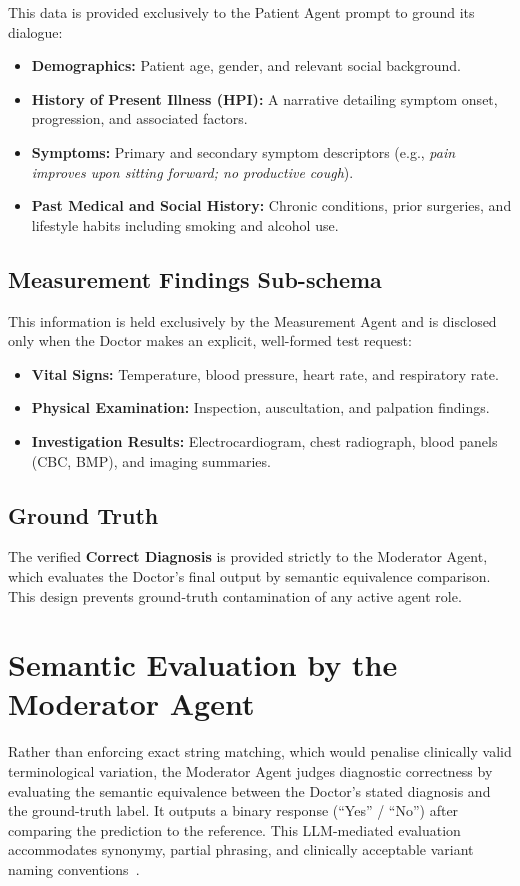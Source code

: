 This data is provided exclusively to the Patient Agent prompt to ground its dialogue:
\begin{itemize}
    \item \textbf{Demographics:} Patient age, gender, and relevant social background.
    \item \textbf{History of Present Illness (HPI):} A narrative detailing symptom onset, progression, and associated factors.
    \item \textbf{Symptoms:} Primary and secondary symptom descriptors (e.g., \textit{pain improves upon sitting forward; no productive cough}).
    \item \textbf{Past Medical and Social History:} Chronic conditions, prior surgeries, and lifestyle habits including smoking and alcohol use.
\end{itemize}

\subsection{Measurement Findings Sub-schema}

This information is held exclusively by the Measurement Agent and is disclosed only when the Doctor makes an explicit, well-formed test request:
\begin{itemize}
    \item \textbf{Vital Signs:} Temperature, blood pressure, heart rate, and respiratory rate.
    \item \textbf{Physical Examination:} Inspection, auscultation, and palpation findings.
    \item \textbf{Investigation Results:} Electrocardiogram, chest radiograph, blood panels (CBC, BMP), and imaging summaries.
\end{itemize}

\subsection{Ground Truth}

The verified \textbf{Correct Diagnosis} is provided strictly to the Moderator Agent, which evaluates the Doctor's final output by semantic equivalence comparison. This design prevents ground-truth contamination of any active agent role.

\section{Semantic Evaluation by the Moderator Agent}

Rather than enforcing exact string matching, which would penalise clinically valid terminological variation, the Moderator Agent judges diagnostic correctness by evaluating the semantic equivalence between the Doctor's stated diagnosis and the ground-truth label. It outputs a binary response (``Yes'' / ``No'') after comparing the prediction to the reference. This LLM-mediated evaluation accommodates synonymy, partial phrasing, and clinically acceptable variant naming conventions~\cite{schmidgall2024agentclinic}.
